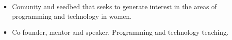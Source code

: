 \documentclass[10pt,a4paper]{altacv}
\begin{document}
\divider

\begin{itemize}

\item Comunity and seedbed that seeks to generate interest in the areas of programming and technology in women.

\item Co-founder, mentor and speaker. Programming and technology teaching.

\end{itemize}

\divider

\medskip










\end{document}
